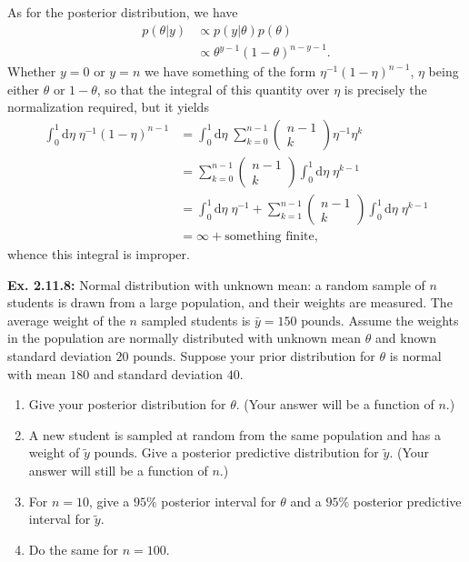 \documentclass{article}
\begin{document}
As for the posterior distribution, we have
\begin{align*}
	p(\theta|y)&\propto p(y|\theta)p(\theta)\\
	&\propto\theta^{y-1}(1-\theta)^{n-y-1}.
\end{align*}
Whether $y=0$ or $y=n$ we have something of the form $\eta^{-1}(1-\eta)^{n-1}$, $\eta$ being either $\theta$ or $1-\theta$, so that the integral of this quantity over $\eta$ is precisely the normalization required, but it yields
\begin{align*}
	\int_0^1\mathrm d\eta\;\eta^{-1}(1-\eta)^{n-1}&=\int_0^1\mathrm d\eta\;\sum_{k=0}^{n-1}\begin{pmatrix}n-1\\k\end{pmatrix}\eta^{-1}\eta^k\\
	&=\sum_{k=0}^{n-1}\begin{pmatrix}n-1\\k\end{pmatrix}\int_0^1\mathrm d\eta\;\eta^{k-1}\\
	&=\int_0^1\mathrm d\eta\;\eta^{-1}+\sum_{k=1}^{n-1}\begin{pmatrix}n-1\\k\end{pmatrix}\int_0^1\mathrm d\eta\;\eta^{k-1}\\
	&=\infty+\text{something finite},
\end{align*}
whence this integral is improper.

\textbf{Ex. 2.11.8: }Normal distribution with unknown mean: a random sample of $n$ students is drawn from a large population, and their weights are measured. The average weight of the $n$ sampled students is $\bar{y}=150\text{ pounds}$. Assume the weights in the population are normally distributed with unknown mean $\theta$ and known standard deviation $20\text{ pounds}$. Suppose your prior distribution for $\theta$ is normal with mean $180$ and standard deviation $40$.
\begin{enumerate}[label=\alph*]
	\item Give your posterior distribution for $\theta$. (Your answer will be a function of $n$.)
	\item A new student is sampled at random from the same population and has a weight of $\tilde{y}\text{ pounds}$. Give a posterior predictive distribution for $\tilde{y}$. (Your answer will still be a function of $n$.)
	\item For $n=10$, give a $95\%$ posterior interval for $\theta$ and a $95\%$ posterior predictive interval for $\tilde{y}$.
	\item Do the same for $n=100$.
\end{enumerate}
\end{document}
